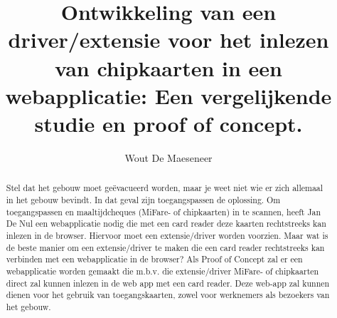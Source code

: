 \documentclass{hogent-article}
\title{Ontwikkeling van een driver/extensie voor het inlezen van chipkaarten in een webapplicatie: Een vergelijkende studie en proof of concept.}
\author{Wout De Maeseneer}
\begin{document}
    
    \begin{abstract}
        Stel dat het gebouw moet geëvacueerd worden, maar je weet niet wie er zich allemaal in het gebouw bevindt. In dat geval zijn toegangspassen de oplossing.
        Om toegangspassen en maaltijdcheques (MiFare- of chipkaarten) in te scannen, heeft Jan De Nul een webapplicatie nodig die met een card reader deze kaarten rechtstreeks kan inlezen in de browser. Hiervoor moet een extensie/driver worden voorzien.
        Maar wat is de beste manier om een extensie/driver te maken die een card reader rechtstreeks kan verbinden met een webapplicatie in de browser?
        Als Proof of Concept zal er een webapplicatie worden gemaakt die m.b.v. die extensie/driver MiFare- of chipkaarten direct zal kunnen inlezen in de web app met een card reader. Deze web-app zal kunnen dienen voor het gebruik van toegangskaarten, zowel voor werknemers als bezoekers van het gebouw.
    \end{abstract}
    
    \tableofcontents
    
    
    
    \printbibliography[heading=bibintoc]
    
    
\end{document}
